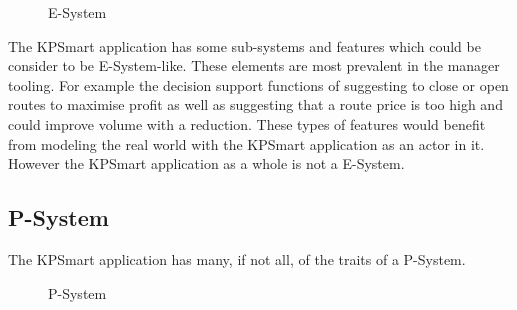 \documentclass{style/CRPITStyle}
\begin{document}
\vspace{.1in}

\begin{figure}[htb]
\caption{\protect\label{e-system}  E-System }
\end{figure}

The KPSmart application has some sub-systems and features which could
be consider to be E-System-like. These elements are most prevalent in
the manager tooling. For example the decision support functions of suggesting
to close or open routes to maximise profit as well as suggesting that a route 
price is too high and could improve volume with a reduction. These types of
features would benefit from modeling the real world with the KPSmart application
as an actor in it. However the KPSmart application as a whole is not a E-System.

\vspace{.1in}

\subsection{P-System}

The KPSmart application has many, if not all, of the traits of a
P-System.

\vspace{.1in}

\begin{figure}[htb]
\caption{\protect\label{p-system}  P-System }
\end{figure}
\end{document}
